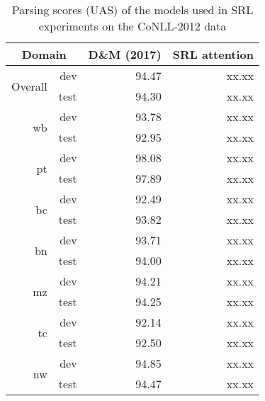 \documentclass[11pt,a4paper]{article}
\begin{document}











\begin{table}
\begin{tabular}{rrrr}
\multicolumn{2}{c}{Domain}  & D\&M (2017) & SRL attention \\ \hline \hline
\multirow{2}{*}{Overall} & dev & 94.47 & xx.xx\\
& test & 94.30 &  xx.xx\\ \hline \hline
\multirow{2}{*}{wb} & dev & 93.78 & xx.xx \\
& test & 92.95 &  xx.xx\\
\multirow{2}{*}{pt} & dev & 98.08 &  xx.xx\\
& test & 97.89 &  xx.xx\\
\multirow{2}{*}{bc} & dev & 92.49&  xx.xx\\
& test & 93.82 &  xx.xx\\
\multirow{2}{*}{bn} & dev & 93.71 &  xx.xx\\
& test & 94.00 &  xx.xx\\
\multirow{2}{*}{mz} & dev & 94.21 &  xx.xx\\
& test & 94.25 &  xx.xx\\
\multirow{2}{*}{tc} & dev & 92.14 &  xx.xx\\
& test & 92.50 &  xx.xx\\
\multirow{2}{*}{nw} & dev & 94.85 &  xx.xx\\
& test & 94.47 & xx.xx
\end{tabular}
\caption{\label{conll12-parsing-numbers} Parsing scores (UAS) of the models used in SRL experiments on the CoNLL-2012 data}
\end{table}
\end{document}
